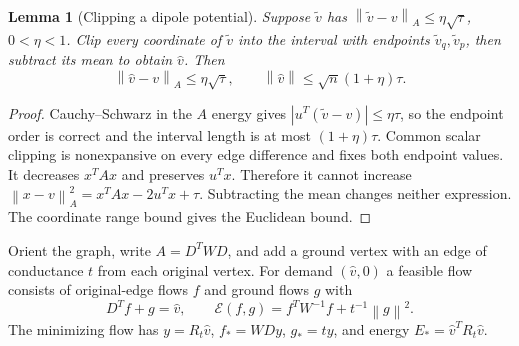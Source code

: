 \documentclass[11pt]{article}
\newtheorem{lemma}[theorem]{Lemma}
\newcommand{\norm}[1]{\left\lVert#1\right\rVert}
\begin{document}
\begin{lemma}[Clipping a dipole potential]
Suppose $\widetilde v$ has
$\norm{\widetilde v-v}_A\le\eta\sqrt\tau$, $0<\eta<1$.
Clip every coordinate of $\widetilde v$ into the interval with endpoints
$\widetilde v_q,\widetilde v_p$, then subtract its mean to obtain
$\widehat v$. Then
\begin{equation}\label{eq:clip}
 \norm{\widehat v-v}_A\le\eta\sqrt\tau,\qquad
 \norm{\widehat v}\le\sqrt n(1+\eta)\tau.
\end{equation}
\end{lemma}
\begin{proof}
Cauchy--Schwarz in the $A$ energy gives
$|u^T(\widetilde v-v)|\le\eta\tau$, so the endpoint order is correct
and the interval length is at most $(1+\eta)\tau$.
Common scalar clipping is nonexpansive on every edge difference and
fixes both endpoint values. It decreases $x^TAx$ and preserves $u^Tx$.
Therefore it cannot increase
$\norm{x-v}_A^2=x^TAx-2u^Tx+\tau$.
Subtracting the mean changes neither expression. The coordinate range
bound gives the Euclidean bound.
\end{proof}

Orient the graph, write $A=D^TWD$, and add a ground vertex with an
edge of conductance $t$ from each original vertex. For demand
$(\widehat v,0)$ a feasible flow consists of original-edge flows $f$
and ground flows $g$ with
\[
 D^Tf+g=\widehat v,
 \qquad \mathcal E(f,g)=f^TW^{-1}f+t^{-1}\norm g^2.
\]
The minimizing flow has $y=R_t\widehat v$,
$f_*=WDy$, $g_*=ty$, and energy
$E_*=\widehat v^TR_t\widehat v$.
\end{document}
